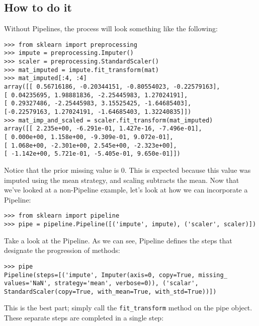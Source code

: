 \documentclass[SKL-MASTER.tex]{subfiles}
\begin{document}
\subsection*{How to do it}
Without Pipelines, the process will look something like the following:
\begin{framed}
	\begin{verbatim}
>>> from sklearn import preprocessing
>>> impute = preprocessing.Imputer()
>>> scaler = preprocessing.StandardScaler()
>>> mat_imputed = impute.fit_transform(mat)
>>> mat_imputed[:4, :4]
array([[ 0.56716186, -0.20344151, -0.80554023, -0.22579163],
[ 0.04235695, 1.98881836, -2.25445983, 1.27024191],
[ 0.29327486, -2.25445983, 3.15525425, -1.64685403],
[-0.22579163, 1.27024191, -1.64685403, 1.32240835]])
>>> mat_imp_and_scaled = scaler.fit_transform(mat_imputed)
array([[ 2.235e+00, -6.291e-01, 1.427e-16, -7.496e-01],
[ 0.000e+00, 1.158e+00, -9.309e-01, 9.072e-01],
[ 1.068e+00, -2.301e+00, 2.545e+00, -2.323e+00],
[ -1.142e+00, 5.721e-01, -5.405e-01, 9.650e-01]])
\end{verbatim}
\end{framed}
Notice that the prior missing value is 0. This is expected because this value was imputed
using the mean strategy, and scaling subtracts the mean.
Now that we've looked at a non-Pipeline example, let's look at how we can incorporate
a Pipeline:
\begin{framed}
	\begin{verbatim}
>>> from sklearn import pipeline
>>> pipe = pipeline.Pipeline([('impute', impute), ('scaler', scaler)])
\end{verbatim}
\end{framed}
Take a look at the Pipeline. As we can see, Pipeline defines the steps that designate the
progression of methods:
\begin{framed}
	\begin{verbatim}
>>> pipe
Pipeline(steps=[('impute', Imputer(axis=0, copy=True, missing_
values='NaN', strategy='mean', verbose=0)), ('scalar',
StandardScaler(copy=True, with_mean=True, with_std=True))])
\end{verbatim}
\end{framed}
This is the best part; simply call the \texttt{fit\_transform} method on the pipe object.
These separate steps are completed in a single step:
\end{document}
